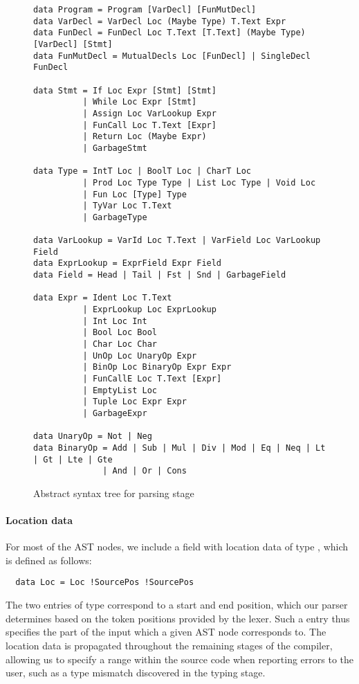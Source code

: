 \begin{figure}
\begin{verbatim}
data Program = Program [VarDecl] [FunMutDecl]
data VarDecl = VarDecl Loc (Maybe Type) T.Text Expr
data FunDecl = FunDecl Loc T.Text [T.Text] (Maybe Type) [VarDecl] [Stmt]
data FunMutDecl = MutualDecls Loc [FunDecl] | SingleDecl FunDecl

data Stmt = If Loc Expr [Stmt] [Stmt]
          | While Loc Expr [Stmt]
          | Assign Loc VarLookup Expr
          | FunCall Loc T.Text [Expr]
          | Return Loc (Maybe Expr)
          | GarbageStmt

data Type = IntT Loc | BoolT Loc | CharT Loc
          | Prod Loc Type Type | List Loc Type | Void Loc
          | Fun Loc [Type] Type
          | TyVar Loc T.Text
          | GarbageType

data VarLookup = VarId Loc T.Text | VarField Loc VarLookup Field
data ExprLookup = ExprField Expr Field
data Field = Head | Tail | Fst | Snd | GarbageField

data Expr = Ident Loc T.Text
          | ExprLookup Loc ExprLookup
          | Int Loc Int
          | Bool Loc Bool
          | Char Loc Char
          | UnOp Loc UnaryOp Expr
          | BinOp Loc BinaryOp Expr Expr
          | FunCallE Loc T.Text [Expr]
          | EmptyList Loc
          | Tuple Loc Expr Expr
          | GarbageExpr

data UnaryOp = Not | Neg
data BinaryOp = Add | Sub | Mul | Div | Mod | Eq | Neq | Lt | Gt | Lte | Gte
              | And | Or | Cons
\end{verbatim}
	\caption{Abstract syntax tree for parsing stage}
  \label{fig:parse-ast}
\end{figure}


\paragraph{Location data}
For most of the AST nodes, we include a field with location data of type
, which is defined as follows:
%
\begin{verbatim}
  data Loc = Loc !SourcePos !SourcePos
\end{verbatim}
%
The two entries of type  correspond to a start and end
position, which our parser determines based on the token positions provided by
the lexer.
Such a  entry thus specifies the part of the input which a given
AST node corresponds to. The location data is propagated throughout the
remaining stages of the compiler, allowing us to specify a range within the
source code when reporting errors to the user, such as a type mismatch
discovered in the typing stage.


